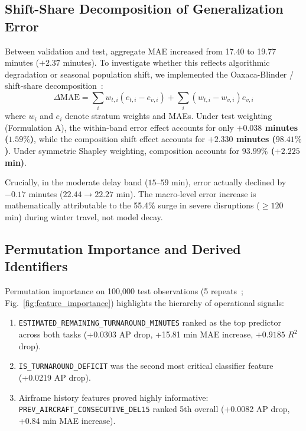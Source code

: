 \documentclass[conference]{IEEEtran}
\begin{document}
\subsection{Shift-Share Decomposition of Generalization Error}
Between validation and test, aggregate MAE increased from 17.40 to 19.77 minutes ($+2.37$ minutes). To investigate whether this reflects algorithmic degradation or seasonal population shift, we implemented the Oaxaca-Blinder / shift-share decomposition~\cite{oaxaca1973male,blinder1973wage}:
\begin{equation}
\Delta \text{MAE} = \sum_{i} w_{t, i} (e_{t, i} - e_{v, i}) + \sum_{i} (w_{t, i} - w_{v, i}) e_{v, i}
\end{equation}
where $w_i$ and $e_i$ denote stratum weights and MAEs. Under test weighting (Formulation A), the within-band error effect accounts for only \textbf{$+0.038$ minutes ($1.59\%$)}, while the composition shift effect accounts for \textbf{$+2.330$ minutes ($98.41\%$)}. Under symmetric Shapley weighting, composition accounts for \textbf{$93.99\%$ ($+2.225$ min)}. 

Crucially, in the moderate delay band ($15$--$59$ min), error actually declined by $-0.17$ minutes ($22.44 \rightarrow 22.27$ min). The macro-level error increase is mathematically attributable to the 55.4\% surge in severe disruptions ($\ge 120$ min) during winter travel, not model decay.

\subsection{Permutation Importance and Derived Identifiers}
Permutation importance on 100,000 test observations (5 repeats~\cite{fisher2019all}; Fig.~\ref{fig:feature_importance}) highlights the hierarchy of operational signals:
\begin{enumerate}
    \item \texttt{ESTIMATED\_}\allowbreak\texttt{REMAINING\_}\allowbreak\texttt{TURNAROUND\_}\allowbreak\texttt{MINUTES} ranked as the top predictor across both tasks (+0.0303 AP drop, +15.81 min MAE increase, $+0.9185$ $R^2$ drop).
    \item \texttt{IS\_TURNAROUND\_DEFICIT} was the second most critical classifier feature (+0.0219 AP drop).
    \item Airframe history features proved highly informative: \texttt{PREV\_}\allowbreak\texttt{AIRCRAFT\_}\allowbreak\texttt{CONSECUTIVE\_}\allowbreak\texttt{DEL15} ranked 5th overall (+0.0082 AP drop, +0.84 min MAE increase).
\end{enumerate}
\end{document}
